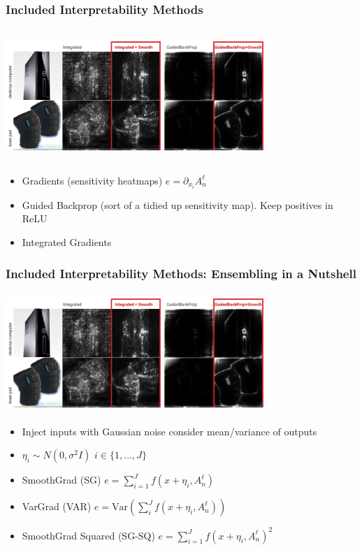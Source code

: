 \documentclass{beamer}
\theoremstyle{mystyle}
\begin{document}
\begin{frame}
	\frametitle{Included Interpretability Methods}
	\includegraphics[width=10cm, height=5cm]{compareSGBP.png}

	\begin{itemize}
	
	\item Gradients (sensitivity heatmaps) $e = \partial_{x_i} A_n^{\ell} $ \pause

	\item Guided Backprop (sort of a tidied up sensitivity map). Keep positives in ReLU \pause
	\item Integrated Gradients
	
	\end{itemize}
\end{frame}
\begin{frame}
	\frametitle{Included Interpretability Methods: Ensembling in a Nutshell}
	\includegraphics[width=10cm, height=4.5cm]{compareSGBP.png}
\begin{itemize}
\item Inject inputs with Gaussian noise consider mean/variance of outputs \pause
\item $\eta_i \sim N(0, \sigma ^2 I)$ $i\in \{1,\ldots, J\} $ \pause
\item SmoothGrad (SG) $e = \sum_{i=1}^{J} {f( x + \eta_i, A_n^{\ell}) }$ \pause
\item VarGrad (VAR) $e = \text{Var}\left(  \sum_{i}^{J} {f(x + \eta_i, A_n^{\ell})}\right) $ \pause
\item SmoothGrad Squared (SG-SQ) $e = \sum_{i=1}^{J} {f( x + \eta_i, A_n^{\ell})^{2} }$
\end{itemize}
\end{frame}
\end{document}
